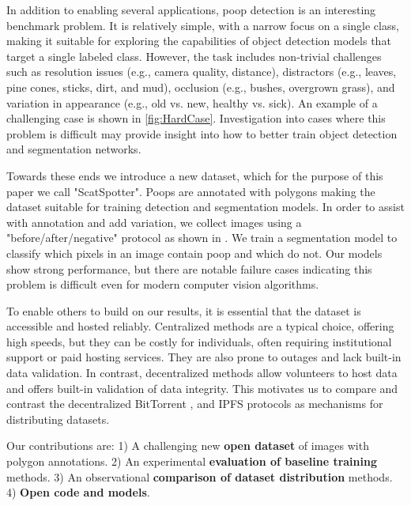 \documentclass[10pt,twocolumn,letterpaper]{article}
\begin{document}
In addition to enabling several applications, poop detection is an interesting benchmark problem.
It is relatively simple, with a narrow focus on a single class, making it suitable for exploring the
  capabilities of object detection models that target a single labeled class.
However, the task includes non-trivial challenges such as resolution issues (e.g., camera quality,
  distance), distractors (e.g., leaves, pine cones, sticks, dirt, and mud), occlusion (e.g., bushes, overgrown
  grass), and variation in appearance (e.g., old vs. new, healthy vs. sick).
An example of a challenging case is shown in \cref{fig:HardCase}.
Investigation into cases where this problem is difficult may provide insight
into how to better train object detection and segmentation networks.

Towards these ends we introduce a new dataset, which for the purpose of this paper we call "ScatSpotter".
Poops are annotated with polygons making the dataset suitable for training detection and segmentation
  models.
In order to assist with annotation and add variation, we collect images using a "before/after/negative"
  protocol as shown in .
We train a segmentation model to classify which pixels in an image contain poop and which do not.
Our models show strong performance, but there are notable failure cases indicating this problem is difficult
  even for modern computer vision algorithms.

To enable others to build on our results, it is essential that the dataset is accessible and hosted
  reliably.
Centralized methods are a typical choice, offering high speeds, but they can be costly for individuals,
  often requiring institutional support or paid hosting services.
They are also prone to outages and lack built-in data validation.
In contrast, decentralized methods allow volunteers to host data and offers built-in validation of data
  integrity.
This motivates us to compare and contrast the decentralized BitTorrent \cite{cohen_incentives_2003}, and
  IPFS \cite{benet_ipfs_2014} protocols as mechanisms for distributing datasets.


Our contributions are:
1) A challenging new \textbf{open dataset} of images with polygon annotations.
2) An experimental \textbf{evaluation of baseline training} methods.
3) An observational \textbf{comparison of dataset distribution} methods.
4) \textbf{Open code and models}.
\end{document}
